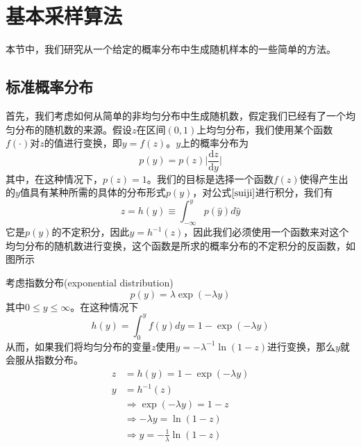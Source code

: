 \section{基本采样算法}
本节中，我们研究从一个给定的概率分布中生成随机样本的一些简单的方法。
\subsection*{标准概率分布}
首先，我们考虑如何从简单的非均匀分布中生成随机数，假定我们已经有了一个均匀分布的随机数的来源。假设$z$在区间$(0,1)$上均匀分布，我们使用某个函数$f(\cdot)$对$z$的值进行变换，即$y=f(z)$。$y$上的概率分布为
\begin{equation}
\label{suiji}
	p(y)=p(z)\bigg|\frac{\mathrm{d}z}{\mathrm{d}y}\bigg|
\end{equation}
其中，在这种情况下，$p(z)=1$。我们的目标是选择一个函数$f(z)$使得产生出的$y$值具有某种所需的具体的分布形式$p(y)$，对公式$\ref{suiji}$进行积分，我们有
\begin{equation}
	z=h(y)\equiv \int _{-\infty}^{y}p(\hat{y})d\hat{y}
\end{equation}
它是$p(y)$的不定积分，因此$y=h^{-1}(z)$，因此我们必须使用一个函数来对这个均匀分布的随机数进行变换，这个函数是所求的概率分布的不定积分的反函数，如图所示
\begin{center}
\end{center}

考虑指数分布(exponential distribution)
\begin{equation}
	p(y)=\lambda \exp (-\lambda y)
\end{equation}
其中$0\leqslant y \leqslant \infty$。在这种情况下
\begin{equation}
	h(y)=\int_0^y f(y)dy=1-\exp (-\lambda y)
\end{equation}
从而，如果我们将均匀分布的变量$z$使用$y=-\lambda^{-1}\ln (1-z)$进行变换，那么$y$就会服从指数分布。
\begin{equation}
\begin{aligned}
	z&=h(y)=1-\exp (-\lambda y)\\
	y&=h^{-1}(z)\\
	 &\Rightarrow \exp(-\lambda y) = 1-z\\
	 &\Rightarrow -\lambda y = \ln (1-z)\\
	 &\Rightarrow y=-\frac{1}{\lambda}\ln (1-z)
\end{aligned}
\end{equation}

